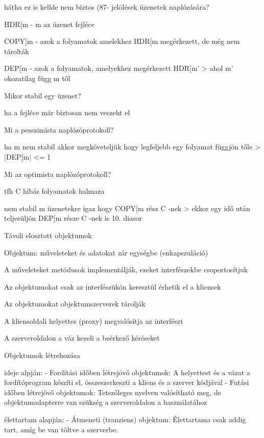 \documentclass[12pt]{article}
\begin{document}
\begin{description}
    \item hátha ez is kellde nem biztos (87-
        jelölések üzenetek naplózására?
    \item HDR[m 
        - m az üzenet fejléce 
    \item COPY[m
        - azok a folyamatok amelekhez HDR[m megérkezett, de még nem tárolták
    \item DEP[m
        - azok a folyamatok, amelyekhez megérkezett HDR[m' 
        > ahol m' okozatilag függ m től
    \item  Mikor stabil egy üzenet?
    \item ha a fejléce már biztosan nem veszeht el
    \item  Mi a pesszimista naplózóprotokoll?
    \item ha m nem stabil akkor megköveteljük hogy legfeljebb egy folyamat függjön tőle
        > |DEP[m| <= 1
    \item  Mi az optimista naplózóprotokoll?
    \item tfh C hibás folyamatok halmaza
    \item nem stabil m üzenetekre igaz hogy COPY[m rész C -nek
        > ekkor egy idő után teljesüljön DEP[m része C -nek  is 
        10. diasor
    \item  Távoli elosztott objektumok
    \item Objektum: műveleteket és adatokat zár egységbe (enkapszuláció)
    \item A műveleteket metódusok implementálják, ezeket interfészekbe csoportosítjuk
    \item Az objektumokat csak az interfészükön keresztül érhetik el a kliensek
    \item Az objektumokat objektumszerverek tárolják
    \item A kliensoldali helyettes (proxy) megvalósítja az interfészt
    \item A szerveroldalon a váz kezeli a beérkező kéréseket
    \item  Objektumok létrehozása
    \item ideje alpján:
        - Fordítási időben létrejövő objektumok: A helyettest és a vázat a fordítóprogram készíti el,
        összeszerkeszti a kliens és a szerver kódjával
        - Futási időben létrejövő objektumok: Tetszőleges nyelven valósítható meg, de objektumadapterre van
        szükség a szerveroldalon a használatához
    \item élettartam alapján:
        - Átmeneti (tranziens) objektum: Élettartama csak addig tart, amíg be van töltve a szerverbe. 

\end{description}
\end{document}
